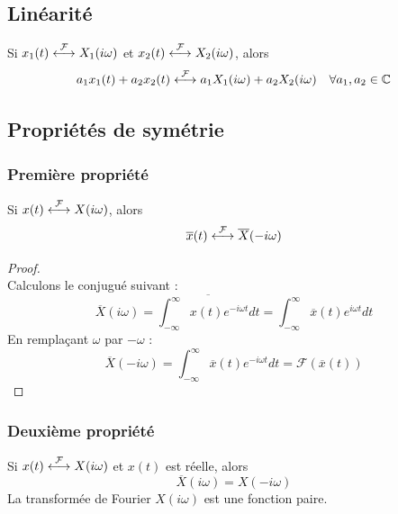 	\subsection{Linéarité}
	Si $x_1(t) \ft X_1(i\omega)$ et $x_2(t) \ft X_2(i\omega)$, alors 
	\begin{equation}
	a_1x_1(t) + a_2x_2(t) \ft a_1X_1(i\omega) + a_2X_2(i\omega)\ \ \
	\forall a_1,a_2 \in \mathbb{C}
	\end{equation}
	
	\subsection{Propriétés de symétrie}
		\subsubsection{Première propriété}
		Si $x(t) \ft X(i\omega)$, alors
		\begin{equation}
		\overline{x}(t) \ft \overline{X}(-i\omega)
		\end{equation}	
		\begin{proof}\ \\
		Calculons le conjugué suivant :
		\begin{equation}
		\overline{X}(i\omega) = \overline{\int_{-\infty}^\infty x(t)e^{-
		i\omega t}dt} = \int_{-\infty}^\infty \overline{x}(t)e^{i\omega t}dt
		\end{equation}	
		En remplaçant $\omega$ par $-\omega$ :
		\begin{equation}
		\overline{X}(-i\omega) = \int_{-\infty}^\infty \overline{x}(t)e^{-i
		\omega t}dt = \mathcal{F}(\overline{x}(t))
		\end{equation}
		\end{proof}
	
		\subsubsection{Deuxième propriété}
		Si $x(t) \ft X(i\omega)$ et $x(t)$ est réelle, alors 	
		\begin{equation}
		\overline{X}(i\omega) = X(-i\omega)
		\end{equation}
		La transformée de Fourier $X(i\omega)$ est une fonction paire.
	
